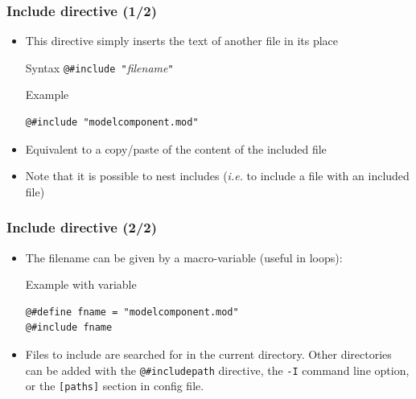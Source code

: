 \documentclass{beamer}
\begin{document}
\begin{frame}[fragile=singleslide]
  \frametitle{Include directive (1/2)}
  \begin{itemize}
  \item This directive simply inserts the text of another file in its place
    \begin{block}{Syntax}
      \verb+@#include "+\textit{filename}\verb+"+
    \end{block}
    \begin{block}{Example}
\begin{verbatim}
@#include "modelcomponent.mod"
\end{verbatim}
    \end{block}
  \item Equivalent to a copy/paste of the content of the included file
  \item Note that it is possible to nest includes (\textit{i.e.} to include a
    file with an included file)
  \end{itemize}
\end{frame}

\begin{frame}[fragile=singleslide]
  \frametitle{Include directive (2/2)}
  \begin{itemize}
\item The filename can be given by a macro-variable (useful in loops):
    \begin{block}{Example with variable}
\begin{verbatim}
@#define fname = "modelcomponent.mod"
@#include fname
\end{verbatim}
    \end{block}
  \item Files to include are searched for in the current directory. Other directories can
    be added with the
    \verb+@#includepath+ directive, the \texttt{-I} command line option, or the
    \texttt{[paths]} section in config file.
  \end{itemize}
\end{frame}
\end{document}
